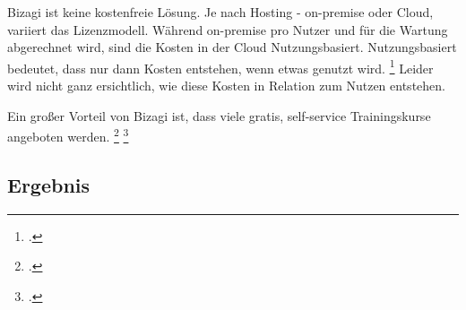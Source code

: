 \begin{figure}[H]
\begin{minipage}{\linewidth}
\begin{center}
\end{center}
\end{minipage}
\end{figure}

Bizagi ist keine kostenfreie Lösung. Je nach Hosting - on-premise oder Cloud,
variiert das Lizenzmodell. Während on-premise pro Nutzer und für die Wartung
abgerechnet wird, sind die Kosten in der Cloud Nutzungsbasiert. Nutzungsbasiert
bedeutet, dass nur dann Kosten entstehen, wenn etwas genutzt wird.
\footcite{bizagipricing} Leider wird nicht ganz ersichtlich, wie diese Kosten in
Relation zum Nutzen entstehen.

Ein großer Vorteil von Bizagi ist, dass viele gratis, self-service
Trainingskurse angeboten werden. \footcite{bizagiproscons}
\footcite{bizagilernen} 


\subsection{Ergebnis}

